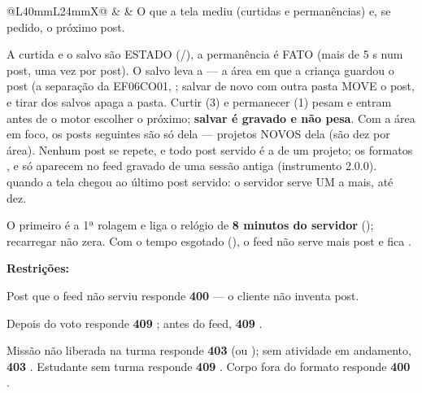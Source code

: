 \begin{tabularx}{\linewidth}{@{}L{40mm}L{24mm}X@{}}
 &  & O que a tela mediu (curtidas e permanências) e, se pedido, o próximo post.\par A curtida e o salvo são ESTADO (/), a permanência é FATO (mais de 5 s num post, uma vez por post). O salvo leva a  --- a área em que a criança guardou o post (a separação da EF06CO01, ; salvar de novo com outra pasta MOVE o post, e tirar dos salvos apaga a pasta. Curtir (3) e permanecer (1) pesam e entram antes de o motor escolher o próximo; \textbf{salvar é gravado e não pesa}. Com a área em foco, os posts seguintes são só dela --- projetos NOVOS dela (são dez por área). Nenhum post se repete, e todo post servido é a  de um projeto; os formatos ,  e  só aparecem no feed gravado de uma sessão antiga (instrumento 2.0.0).  quando a tela chegou ao último post servido: o servidor serve UM a mais, até dez.\par O primeiro  é a 1ª rolagem e liga o relógio de \textbf{8 minutos do servidor} (); recarregar não zera. Com o tempo esgotado (), o feed não serve mais post e  fica .\par \textbf{Restrições:}\par \hspace*{1em}\textbullet{} Post que o feed não serviu responde \textbf{400}  --- o cliente não inventa post.\par \hspace*{1em}\textbullet{} Depois do voto responde \textbf{409} ; antes do feed, \textbf{409} .\par \hspace*{1em}\textbullet{} Missão não liberada na turma responde \textbf{403}  (ou ); sem atividade em andamento, \textbf{403} . Estudante sem turma responde \textbf{409} . Corpo fora do formato responde \textbf{400} .\\

\end{tabularx}
